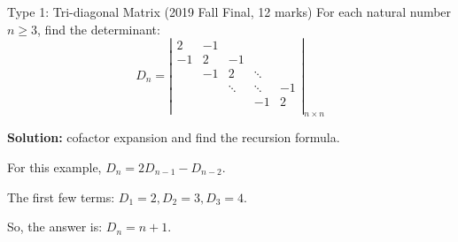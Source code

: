 \documentclass{beamer}
\begin{document}
\begin{frame}{Type 1: Tri-diagonal Matrix}
(2019 Fall Final, 12 marks) For each natural number $n\geqslant 3$, find the determinant:
\begin{equation*}
    D_n=\left| \begin{matrix}
        2&		-1&		&		&		\\
        -1&		2&		-1&		&		\\
        &		-1&		2&		\ddots&		\\
        &		&		\ddots&		\ddots&		-1\\
        &		&		&		-1&		2\\
    \end{matrix} \right|_{n\times n}
\end{equation*}

\textbf{Solution:} cofactor expansion and find the recursion formula.

\vspace{3pt}
For this example, $D_n=2D_{n-1}-D_{n-2}$.

\vspace{3pt}
The first few terms: $D_1=2, D_2=3, D_3=4$.

\vspace{3pt}
So, the answer is: $D_n=n+1$.
\end{frame}
\end{document}
